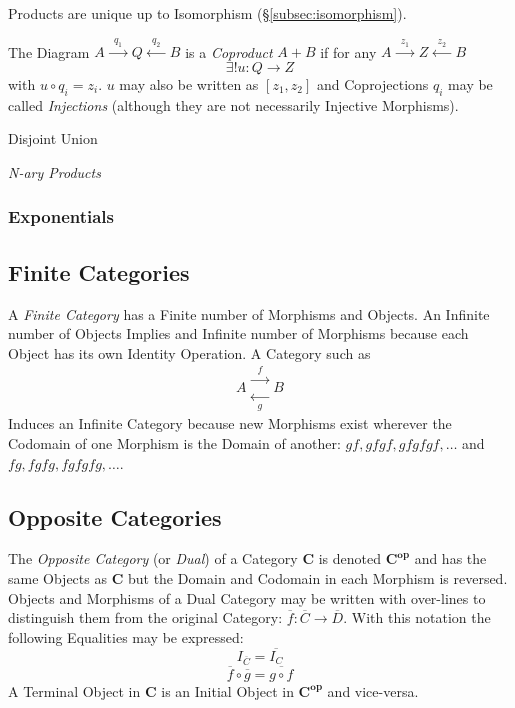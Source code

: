 \documentclass{article}
\begin{document}
Products are unique up to Isomorphism (\S\ref{subsec:isomorphism}).

The Diagram $A \xrightarrow{\;\;q_1\;\;} Q \xleftarrow{\;\;q_2\;\;} B$
is a \emph{Coproduct} $A + B$ if for any $A \xrightarrow{\;\;z_1\;\;} Z
\xleftarrow{\;\;z_2\;\;} B$
\[
    \exists!u : Q \rightarrow Z
\]
with $u \circ q_i = z_i$. $u$ may also be written as $[ z_1, z_2 ]$
and Coprojections $q_i$ may be called \emph{Injections} (although they
are not necessarily Injective Morphisms).

Disjoint Union %

\emph{N-ary Products}

\subsubsection{Exponentials}\label{subsec:category_exponential}

\subsection{Finite Categories}\label{subsec:finite_categories}

A \emph{Finite Category} has a Finite number of Morphisms and
Objects. An Infinite number of Objects Implies and Infinite number of
Morphisms because each Object has its own Identity Operation. A
Category such as
\[
    A
    \begin{matrix}
    \xrightarrow{\;\;f\;\;}\\
    \xleftarrow[\;\;g\;\;]{}
    \end{matrix}
    B
\]
Induces an Infinite Category because new Morphisms exist wherever the
Codomain of one Morphism is the Domain of another: $gf, gfgf, gfgfgf,
\ldots$ and $fg, fgfg, fgfgfg, \ldots$.

\subsection{Opposite Categories}\label{subsec:opposite_categories}

The \emph{Opposite Category} (or \emph{Dual}) of a Category
$\mathbf{C}$ is denoted $\mathbf{C^{op}}$ and has the same Objects as
$\mathbf{C}$ but the Domain and Codomain in each Morphism is
reversed. Objects and Morphisms of a Dual Category may be written with
over-lines to distinguish them from the original Category:
$\overline{f}: \overline{C} \rightarrow \overline{D}$. With this
notation the following Equalities may be expressed:
\[
    I_{\overline{C}} = \overline{I_C}
\]\[
    \overline{f} \circ \overline{g} = \overline{g \circ f}
\]
A Terminal Object in $\mathbf{C}$ is an Initial Object in
$\mathbf{C^{op}}$ and vice-versa.
\end{document}
